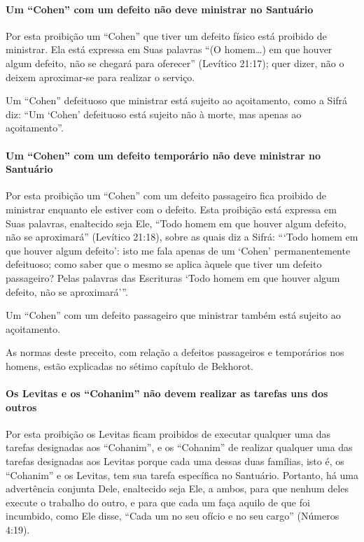 \paragraph{Um ``Cohen'' com um defeito não deve ministrar no Santuário}

Por esta proibição um ``Cohen'' que tiver um defeito físico está
proibido de ministrar. Ela está expressa em Suas palavras ``(O homem\ldots{})
em que houver algum defeito, não se chegará para oferecer'' (Levítico
21:17); quer dizer, não o deixem aproximar-se para realizar o serviço.

Um ``Cohen'' defeituoso que ministrar está sujeito ao açoitamento, como
a Sifrá diz: ``Um `Cohen' defeituoso está sujeito não à morte, mas
apenas ao açoitamento''.

\paragraph{Um ``Cohen'' com um defeito temporário não deve ministrar no Santuário}

Por esta proibição um ``Cohen'' com um defeito passageiro fica proibido
de ministrar enquanto ele estiver com o defeito. Esta proibição está
expressa em Suas palavras, enaltecido seja Ele, ``Todo homem em que
houver algum defeito, não se aproximará'' (Levítico 21:18), sobre as
quais diz a Sifrá: ```Todo homem em que houver algum defeito': isto me
fala apenas de um `Cohen' permanentemente defeituoso; como saber que o mesmo se aplica àquele que tiver um defeito passageiro? Pelas palavras das Escrituras `Todo homem
em que houver algum defeito, não se aproximará'''.

Um ``Cohen'' com um defeito passageiro que ministrar também está
sujeito ao açoitamento.

As normas deste preceito, com relação a defeitos passageiros e
temporários nos homens, estão explicadas no sétimo capítulo de Bekhorot.

\paragraph{Os Levitas e os ``Cohanim'' não devem realizar as tarefas uns dos outros}

Por esta proibição os Levitas ficam proibidos de executar qualquer uma
das tarefas designadas aos ``Cohanim'', e os ``Cohanim'' de realizar
qualquer uma das tarefas designadas aos Levitas porque cada uma dessas
duas famílias, isto é, os ``Cohanim'' e os Levitas, tem sua tarefa
específica no Santuário. Portanto, há uma advertência conjunta Dele,
enaltecido seja Ele, a ambos, para que nenhum deles execute o trabalho
do outro, e para que cada um faça aquilo de que foi incumbido, como Ele
disse, ``Cada um no seu ofício e no seu cargo'' (Números 4:19).

